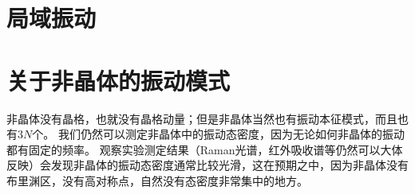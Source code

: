 \section{局域振动}

\section{关于非晶体的振动模式}

非晶体没有晶格，也就没有晶格动量；但是非晶体当然也有振动本征模式，而且也有$3N$个。
我们仍然可以测定非晶体中的振动态密度，因为无论如何非晶体的振动都有固定的频率。
观察实验测定结果（Raman光谱，红外吸收谱等仍然可以大体反映）会发现非晶体的振动态密度通常比较光滑，这在预期之中，因为非晶体没有布里渊区，没有高对称点，自然没有态密度非常集中的地方。